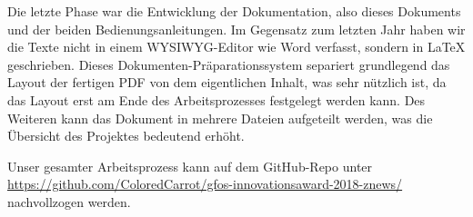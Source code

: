 Die letzte Phase war die Entwicklung der Dokumentation,
also dieses Dokuments und der beiden Bedienungsanleitungen.
Im Gegensatz zum letzten Jahr haben wir die Texte nicht in einem WYSIWYG-Editor wie Word verfasst,
sondern in \LaTeX{} geschrieben.
Dieses Dokumenten-Präparationssystem separiert grundlegend das Layout der fertigen PDF
von dem eigentlichen Inhalt,
was sehr nützlich ist,
da das Layout erst am Ende des Arbeitsprozesses festgelegt werden kann.
Des Weiteren kann das Dokument in mehrere Dateien aufgeteilt werden,
was die Übersicht des Projektes bedeutend erhöht.

Unser gesamter Arbeitsprozess kann auf dem GitHub-Repo unter
\url{https://github.com/ColoredCarrot/gfos-innovationsaward-2018-znews/}
nachvollzogen werden.
